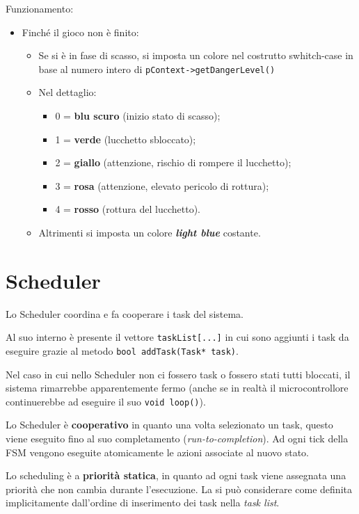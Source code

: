 Funzionamento:
\begin{itemize}
	\item Finché il gioco non è finito:
	\begin{itemize}
		\item Se si è in fase di scasso, si imposta un colore nel costrutto swhitch-case in base al numero intero di \texttt{pContext->getDangerLevel()}
			\item Nel dettaglio:
			\begin{itemize}
				\item 0 = \textbf{blu scuro} (inizio stato di scasso); 
				\item 1 = \textbf{verde} (lucchetto sbloccato);
				\item 2 = \textbf{giallo} (attenzione, rischio di rompere il lucchetto);
				\item 3 = \textbf{rosa} (attenzione, elevato pericolo di rottura);
				\item 4 = \textbf{rosso} (rottura del lucchetto).
			\end{itemize}
		\item Altrimenti si imposta un colore \textbf{\textit{light blue}} costante.
	\end{itemize}
\end{itemize}

\section{Scheduler}
Lo Scheduler coordina e fa cooperare i task del sistema.

Al suo interno è presente il vettore \texttt{taskList[...]} in cui sono aggiunti i task da eseguire grazie al metodo \texttt{bool addTask(Task* task)}.

Nel caso in cui nello Scheduler non ci fossero task o fossero stati tutti bloccati, il sistema rimarrebbe apparentemente fermo (anche se in realtà il microcontrollore continuerebbe ad eseguire il suo \texttt{void loop()}).

Lo Scheduler è \textbf{cooperativo} in quanto una volta selezionato un task, questo viene eseguito fino al suo completamento (\textit{run-to-completion}). Ad ogni tick della FSM vengono eseguite atomicamente le azioni associate al nuovo stato.

Lo scheduling è a \textbf{priorità statica}, in quanto ad ogni task viene assegnata una priorità che non cambia durante l'esecuzione. La si può considerare come definita implicitamente dall'ordine di inserimento dei task nella \textit{task list}.

